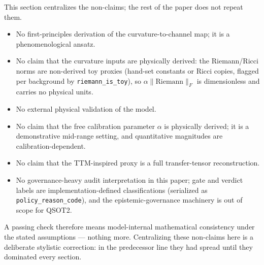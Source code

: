 This section centralizes the non-claims; the rest of the paper does not repeat them.

\begin{itemize}[leftmargin=1.5em]
\item No first-principles derivation of the curvature-to-channel map; it is a
  phenomenological ansatz.
\item No claim that the curvature inputs are physically derived: the Riemann/Ricci norms
  are non-derived toy proxies (hand-set constants or Ricci copies, flagged per background
  by \texttt{riemann\_is\_toy}), so $\alpha\lVert\mathrm{Riemann}\rVert_F$ is dimensionless
  and carries no physical units.
\item No external physical validation of the model.
\item No claim that the free calibration parameter $\alpha$ is physically derived; it is
  a demonstrative mid-range setting, and quantitative magnitudes are
  calibration-dependent.
\item No claim that the TTM-inspired proxy is a full transfer-tensor reconstruction.
\item No governance-heavy audit interpretation in this paper; gate and verdict labels are
  implementation-defined classifications (serialized as \texttt{policy\_reason\_code}), and
  the epistemic-governance machinery is out of scope for QSOT2.
\end{itemize}

A passing check therefore means model-internal mathematical consistency under the stated
assumptions --- nothing more. Centralizing these non-claims here is a deliberate
stylistic correction: in the predecessor line they had spread until they dominated every
section.

